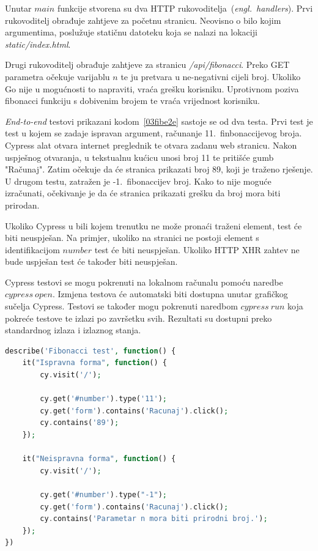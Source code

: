 Unutar $main$ funkcije stvorena su dva HTTP rukovoditelja~(\textit{engl.~handlers}). Prvi
rukovoditelj obrađuje zahtjeve za početnu stranicu. Neovisno o bilo kojim argumentima, poslužuje
statičnu datoteku koja se nalazi na lokaciji \textit{static/index.html}.

Drugi rukovoditelj obrađuje zahtjeve za stranicu \textit{/api/fibonacci}. Preko GET parametra
očekuje varijablu $n$ te ju pretvara u ne-negativni cijeli broj. Ukoliko Go nije u mogućnosti
to napraviti, vraća grešku korisniku. Uprotivnom poziva fibonacci funkciju s dobivenim brojem te
vraća vrijednost korisniku.

\textit{End-to-end} testovi prikazani kodom~\ref{03fibe2e} sastoje se od dva testa. Prvi test je
test u kojem se zadaje ispravan argument, računanje 11.~finbonaccijevog broja. Cypress alat otvara
internet preglednik te otvara zadanu web stranicu. Nakon uspješnog otvaranja, u tekstualnu kućicu
unosi broj 11 te pritišće gumb "Računaj". Zatim očekuje da će stranica prikazati broj 89, koji je
traženo rješenje. U drugom testu, zatražen je -1.~fibonaccijev broj. Kako to nije moguće izračunati,
očekivanje je da će stranica prikazati grešku da broj mora biti prirodan.

Ukoliko Cypress u bili kojem trenutku ne može pronaći traženi element, test će biti neuspješan. Na
primjer, ukoliko na stranici ne postoji element s identifikacijom $number$ test će biti neuspješan.
Ukoliko HTTP XHR zahtev ne bude uspješan test će također biti neuspješan.

Cypress testovi se mogu pokrenuti na lokalnom računalu pomoću naredbe $cypress~open$. Izmjena
testova će automatski biti dostupna unutar grafičkog sučelja Cypress. Testovi se također mogu
pokrenuti naredbom $cypress~run$ koja pokreće testove te izlazi po završetku svih. Rezultati su
dostupni preko standardnog izlaza i izlaznog stanja.

\begin{lstlisting}[language=php,float=h]
describe('Fibonacci test', function() {
    it("Ispravna forma", function() {
        cy.visit('/');

        cy.get('#number').type('11');
        cy.get('form').contains('Racunaj').click();
        cy.contains('89');
    });

    it("Neispravna forma", function() {
        cy.visit('/');

        cy.get('#number').type("-1");
        cy.get('form').contains('Racunaj').click();
        cy.contains('Parametar n mora biti prirodni broj.');
    });
})
\end{lstlisting}

